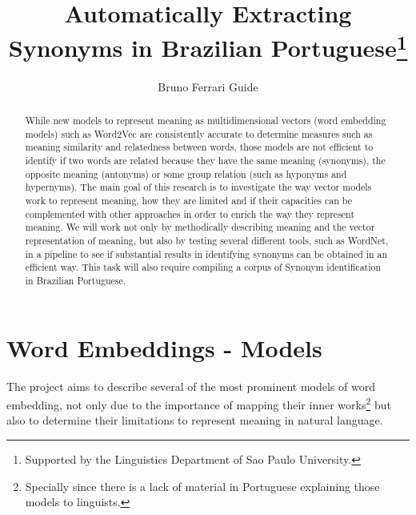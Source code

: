 \documentclass[runningheads]{llncs}
\begin{document}
%
\title{Automatically Extracting Synonyms in Brazilian Portuguese\thanks{Supported by the Linguistics Department of Sao Paulo University.}}
%
%
\author{Bruno Ferrari Guide}
%
%
%
\maketitle              %
%
\begin{abstract}
While new models to represent meaning as multidimensional vectors (word embedding models) such as Word2Vec \cite{mikolov2013} are consistently accurate to determine measures such as meaning similarity and relatedness between words, those models are not efficient to identify if two words are related because they have the same meaning (synonyms), the opposite meaning (antonyms) or some group relation (such as hyponyms and hypernyms). The main goal of this research is to investigate the way vector models work to represent meaning, how they are limited and if their capacities can be complemented with other approaches in order to enrich the way they represent meaning. We will work not only by methodically describing meaning and the vector representation of meaning, but also by testing several different tools, such as WordNet, in a pipeline to see if substantial results in identifying synonyms can be obtained in an efficient way. This task will also require compiling a corpus of Synonym identification in Brazilian Portuguese.

\end{abstract}
%
%
%
\section{Word Embeddings - Models}

The project aims to describe several of the most prominent models of word embedding, not only due to the importance of mapping their inner works\footnote{Specially since there is a lack of material in Portuguese explaining those models to linguists.} but also to determine their limitations to represent meaning in natural language.\\
\end{document}
